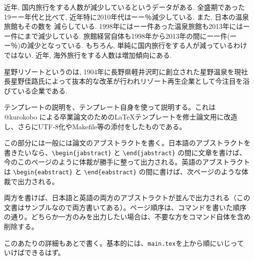 


\begin{jabstract}

	近年, 国内旅行をする人数が減少しているというデータがある. 全盛期であった19ーー年代と比べて, 近年特に2010年代はーー％減少している. また, 日本の温泉旅館もその数を
	減らしている. 1998年にはーー件あった温泉旅館も2013年にはーー件にまで減少している. 旅館経営自体も1998年から2013年の間にーー件(ーー％)の減少となっている. 
	もちろん, 単純に国内旅行をする人が減っているわけではない. 近年, 海外旅行をする人数は増加傾向にある. 

	星野リゾートというのは, 1904年に長野県軽井沢町に創立された星野温泉を現社長星野佳路氏によって抜本的な改革が行われリゾート再生企業として今注目を浴びている企業である. 

テンプレートの説明を、テンプレート自身を使って説明する。これは @kurokobo による卒業論文のための\LaTeX テンプレートを修士論文用に改造し、さらにUTF-8化やMakefile等の添付をしたものである。

この部分には一般には論文のアブストラクトを書く。日本語のアブストラクトを書きたいなら、\verb|\begin{jabstract}| と \verb|\end{jabstract}| の間に文章を書けば、今のこのページのように体裁が勝手に整って出力される。英語のアブストラクトは \verb|\begin{eabstract}| と \verb|\end{eabstract}| の間に書けば、次ページのような体裁で出力される。

両方を書けば、日本語と英語の両方のアブストラクトが並んで出力される（この文書はサンブルなので両方書いてある）。ページ順序は、コマンドを書いた順序の通り。どちらか一方のみを出力したい場合は、不要な方をコマンド自体を含め削除する。

このあたりの詳細もあとで書く。基本的には、{\tt main.tex}を上から順にいじっていけばできるはず。

\end{jabstract}





